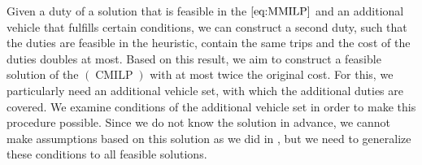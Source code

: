 Given a duty of a solution that is feasible in the $\eqref{eq:MMILP}$ and an additional vehicle that fulfills certain conditions, we can construct a second duty, such that the duties are feasible in the heuristic, contain the same trips and the cost of the duties doubles at most. Based on this result, we aim to construct a feasible solution of the $(\operatorname{CMILP})$ with at most twice the original cost. For this, we particularly need an additional vehicle set, with which the additional duties are covered. We examine conditions of the additional vehicle set in order to make this procedure possible. Since we do not know the solution in advance, we cannot make assumptions based on this solution as we did in , but we need to generalize these conditions to all feasible solutions.

\begin{definition}[Conditions]
\label{def:conditions}


\end{definition}
